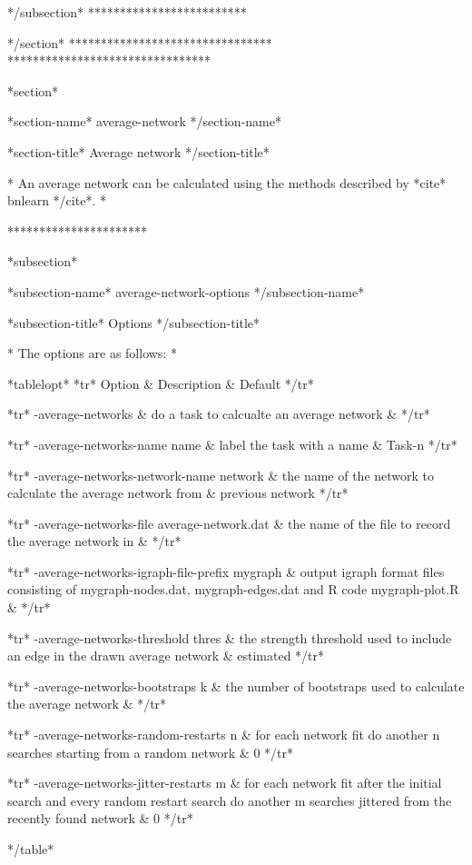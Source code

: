 */subsection* *************************



*/section* ******************************** ********************************

*section*

*section-name* average-network */section-name*

*section-title* Average network */section-title*

* An average network can be calculated using the methods described by *cite* bnlearn */cite*. *

**********************

*subsection*

*subsection-name* average-network-options */subsection-name*

*subsection-title* Options */subsection-title*

* The options are as follows: *

*tablelopt* *tr* Option & Description & Default */tr*

*tr*
 -average-networks  & do a task to calcualte an average network &
*/tr*

*tr*
  -average-networks-name name & label the task with a name & Task-n
*/tr*

*tr*
  -average-networks-network-name network & the name of the network to calculate the average network from & previous network
*/tr*

*tr*
  -average-networks-file average-network.dat & the name of the file to record the average network in &
*/tr*

*tr* -average-networks-igraph-file-prefix mygraph & output igraph format files consisting of mygraph-nodes.dat, mygraph-edges.dat and R code mygraph-plot.R & */tr*

*tr* -average-networks-threshold thres & the strength threshold used to include an edge in the drawn average network & estimated */tr*

*tr* -average-networks-bootstraps k & the number of bootstraps used to calculate the average network & */tr*

*tr*
  -average-networks-random-restarts n & for each network fit do another n searches starting from a random network & 0
*/tr*

*tr*
  -average-networks-jitter-restarts m & for each network fit after the initial search and every random restart search do another m searches jittered from the recently found network & 0
*/tr*

*/table*

